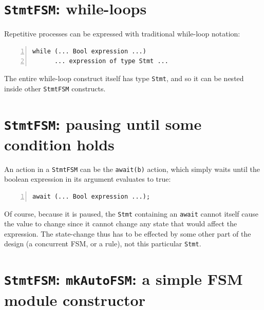 
\section{{\tt StmtFSM}: while-loops}


Repetitive processes can be expressed with traditional while-loop notation:

{\footnotesize
\begin{Verbatim}[frame=single, numbers=left]
   while (... Bool expression ...)
      ... expression of type Stmt ...
\end{Verbatim}
}

The entire while-loop construct itself has type \verb|Stmt|, and so it
can be nested inside other \verb|StmtFSM| constructs.


\section{{\tt StmtFSM}: pausing until some condition holds}


An action in a \verb|StmtFSM| can be the \verb|await(b)| action, which
simply waits until the boolean expression in its argument evaluates to
true:

{\footnotesize
\begin{Verbatim}[frame=single, numbers=left]
   await (... Bool expression ...);
\end{Verbatim}
}

Of course, because it is paused, the \verb|Stmt| containing an
\verb|await| cannot itself cause the value to change since it cannot
change any state that would affect the expression.  The state-change
thus has to be effected by some other part of the {\BSV} design (a
concurrent FSM, or a rule), not this particular \verb|Stmt|.


\section{{\tt StmtFSM}: {\tt mkAutoFSM}: a simple FSM module constructor}

